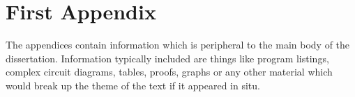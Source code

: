 \appendix
\chapter{First Appendix}
The appendices contain information which is peripheral to the main body of the dissertation. Information typically included are things like program listings, complex circuit diagrams, tables, proofs, graphs or any other material which would break up the theme of the text if it appeared in situ.